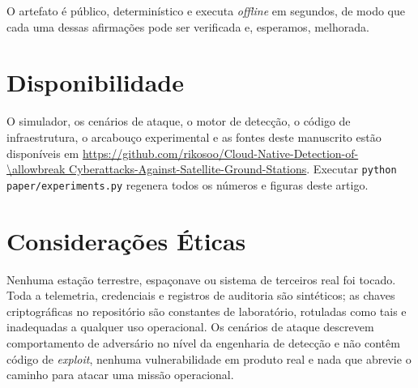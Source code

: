 \documentclass[conference]{IEEEtran}
\begin{document}
O artefato é público, determinístico e executa \emph{offline} em segundos, de
modo que cada uma dessas afirmações pode ser verificada e, esperamos,
melhorada.

\section*{Disponibilidade}

O simulador, os cenários de ataque, o motor de detecção, o código de
infraestrutura, o arcabouço experimental e as fontes deste manuscrito estão
disponíveis em
\url{https://github.com/rikosoo/Cloud-Native-Detection-of-\allowbreak Cyberattacks-Against-Satellite-Ground-Stations}.
Executar \texttt{python paper/experiments.py} regenera todos os números e
figuras deste artigo.

\section*{Considerações Éticas}

Nenhuma estação terrestre, espaçonave ou sistema de terceiros real foi tocado.
Toda a telemetria, credenciais e registros de auditoria são sintéticos; as
chaves criptográficas no repositório são constantes de laboratório, rotuladas
como tais e inadequadas a qualquer uso operacional. Os cenários de ataque
descrevem comportamento de adversário no nível da engenharia de detecção e não
contêm código de \emph{exploit}, nenhuma vulnerabilidade em produto real e nada
que abrevie o caminho para atacar uma missão operacional.



\end{document}
